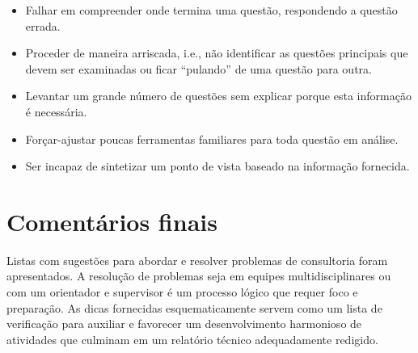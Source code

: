 \begin{itemize}
	\item Falhar em compreender onde termina uma questão, respondendo a questão
	errada.
	\item  Proceder de maneira arriscada, i.e., não identificar as questões
	principais que devem ser examinadas ou ficar ``pulando'' de uma
	questão para outra.
	\item Levantar um grande número de questões sem explicar porque esta
	informação é necessária.
	\item  Forçar-ajustar poucas ferramentas familiares para toda questão em
	análise.
	\item  Ser incapaz de sintetizar um ponto de vista baseado na informação
	fornecida.
\end{itemize}

\section{Comentários finais}

Listas com sugestões  para abordar e resolver problemas de consultoria foram apresentados. A resolução de problemas seja em equipes multidisciplinares ou com um orientador e supervisor é um processo lógico que requer foco e preparação. As dicas fornecidas esquematicamente servem como um lista de verificação para auxiliar e favorecer um desenvolvimento harmonioso de atividades que culminam em um relatório técnico adequadamente redigido.